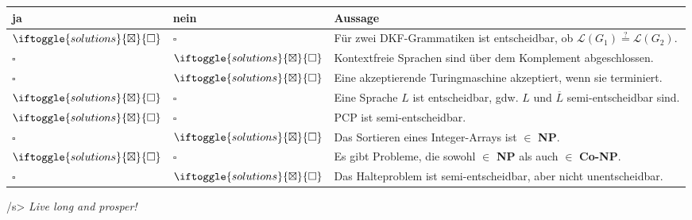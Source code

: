 \documentclass{article}
\newcommand{\mpsol}{\ensuremath\iftoggle{solutions}{\boxtimes}{\square}}
\begin{document}
\begin{tabular}{ll|l}
ja & nein & Aussage \\
\hline
$\mpsol$ & $\square$ & Für zwei DKF-Grammatiken ist entscheidbar, ob $\mathcal{L}(G_1) \stackrel{?}{=} \mathcal{L}(G_2)$. \\
$\square$ & $\mpsol$ & Kontextfreie Sprachen sind über dem Komplement abgeschlossen. \\
$\square$ & $\mpsol$ & Eine akzeptierende Turingmaschine akzeptiert, wenn sie terminiert. \\
$\mpsol$ & $\square$ & Eine Sprache $L$ ist entscheidbar, gdw. $L$ und $\overline{L}$ semi-entscheidbar sind. \\
$\mpsol$ & $\square$ & PCP ist semi-entscheidbar. \\
$\square$ & $\mpsol$ & Das Sortieren eines Integer-Arrays ist $\in$ \textbf{NP}. \\
$\mpsol$ & $\square$ & Es gibt Probleme, die sowohl $\in$ \textbf{NP} als auch $\in$ \textbf{Co-NP}. \\
$\square$ & $\mpsol$ & Das Halteproblem ist semi-entscheidbar, aber nicht unentscheidbar.
\end{tabular}

\vfill{}
\begin{flushright}
\</s> \emph{Live long and prosper!}
\end{flushright}
\end{document}
